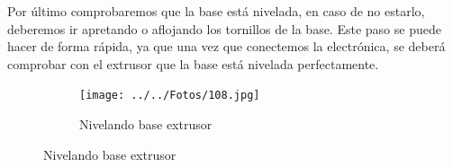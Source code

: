 		Por último comprobaremos que la base está nivelada, en caso de no estarlo, deberemos ir apretando o aflojando los tornillos de la base. Este paso se puede hacer de forma rápida, ya que una vez que conectemos la electrónica, se deberá comprobar con el extrusor que la base está nivelada perfectamente.
		\begin{figure}[H]
		        \centering
		        \begin{subfigure}[htb]{0.5\textwidth}
		                \centering
		                \texttt{[image: ../../Fotos/108.jpg]}
		                \caption{Nivelando base extrusor }
		                \label{fig:27.z}
		        \end{subfigure}
		\end{figure}
